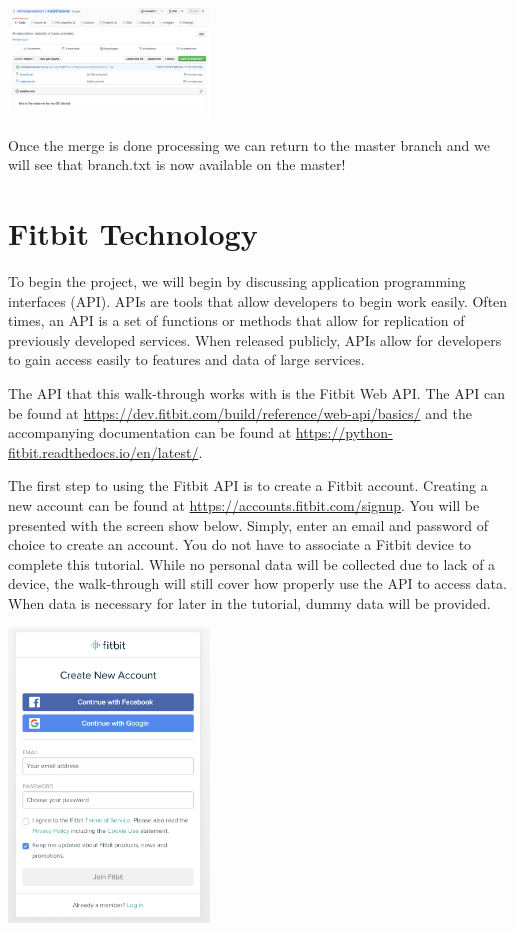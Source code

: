 \documentclass[]{book}
\begin{document}
\includegraphics[width=0.40000\textwidth]{images/final.png}

Once the merge is done processing we can return to the master branch and
we will see that branch.txt is now available on the master!

\chapter{Fitbit Technology}\label{fitbit-technology}

To begin the project, we will begin by discussing application
programming interfaces (API). APIs are tools that allow developers to
begin work easily. Often times, an API is a set of functions or methods
that allow for replication of previously developed services. When
released publicly, APIs allow for developers to gain access easily to
features and data of large services.

The API that this walk-through works with is the Fitbit Web API. The API
can be found at
\url{https://dev.fitbit.com/build/reference/web-api/basics/} and the
accompanying documentation can be found at
\url{https://python-fitbit.readthedocs.io/en/latest/}.

The first step to using the Fitbit API is to create a Fitbit account.
Creating a new account can be found at
\url{https://accounts.fitbit.com/signup}. You will be presented with the
screen show below. Simply, enter an email and password of choice to
create an account. You do not have to associate a Fitbit device to
complete this tutorial. While no personal data will be collected due to
lack of a device, the walk-through will still cover how properly use the
API to access data. When data is necessary for later in the tutorial,
dummy data will be provided.

\includegraphics[width=0.40000\textwidth]{images/fitbitAccount.png}
\end{document}
